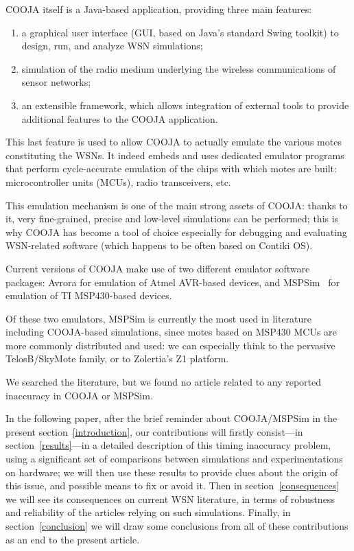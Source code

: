 \documentclass[a4paper,10pt]{article}
\begin{document}
COOJA itself is a Java-based application, providing three main features:
\begin{enumerate}
\item a graphical user interface (GUI, based on Java's standard Swing toolkit)
to design, run, and analyze WSN simulations;
\item simulation of the radio medium underlying the wireless communications
of sensor networks;
\item an extensible framework, which allows integration of external tools
to provide additional features to the COOJA application.
\end{enumerate}
This last feature is used to allow COOJA to actually emulate the various
motes constituting the WSNs. It indeed embeds and uses dedicated emulator
programs that perform cycle-accurate emulation of the chips with which motes
are built: microcontroller units (MCUs), radio transceivers, etc.

This emulation mechanism is one of the main strong assets of COOJA:
thanks to it, very fine-grained, precise and low-level simulations
can be performed; this is why COOJA has become a tool of choice especially
for debugging and evaluating WSN-related software (which happens to be
often based on Contiki OS).

Current versions of COOJA make use of two different emulator software
packages: Avrora for emulation of Atmel AVR-based devices, and
MSPSim~\cite{MSPSim} for emulation of TI MSP430-based devices.

Of these two emulators, MSPSim is currently the most used in literature
including COOJA-based simulations, since motes based on MSP430 MCUs are
more commonly distributed and used: we can especially think to the pervasive
TelosB/SkyMote family, or to Zolertia's Z1 platform.

We searched the literature, but we found no article related to any reported
inaccuracy in COOJA or MSPSim.

In the following paper, after the brief reminder about COOJA/MSPSim in the
present section~\ref{introduction}, our contributions will firstly
consist---in section~\ref{results}---in a detailed description of this
timing inaccuracy problem, using a significant set of comparisons between
simulations and experimentations on hardware; we will then use these results
to provide clues about the origin of this issue, and possible means to fix
or avoid it.
Then in section~\ref{consequences} we will see its consequences on current
WSN literature, in terms of robustness and reliability of the articles
relying on such simulations. Finally, in section~\ref{conclusion}
we will draw some conclusions from all of these contributions as an end
to the present article.
\end{document}
